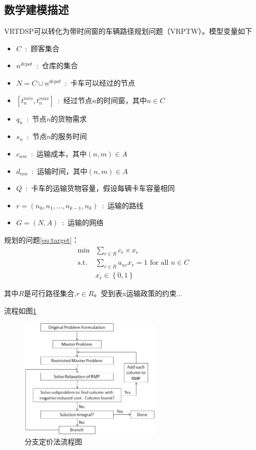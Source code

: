 \documentclass[11pt,a4paper,UTF8]{ctexart}
\numberwithin{equation}{section}
\begin{document}
\subsection{数学建模描述}
\label{sec:math_model}
VRTDSP可以转化为带时间窗的车辆路径规划问题（VRPTW）。模型变量如下
\begin{itemize}
	\item $C$~:~顾客集合
	\item $n^{depot}$~:~仓库的集合
	\item $N=C\cup n^{depot}$~:~卡车可以经过的节点
	\item $\left[t_{n}^{min}, t_{n}^{max}\right]$~:~经过节点$n$的时间窗，其中$n\in C$
	\item $q_n$~:~节点$n$的货物需求
	\item $s_n$~:~节点$n$的服务时间
	\item $c_{nm}$~:~运输成本，其中$\left(n,m\right) \in A $
	\item $d_{nm}$~:~运输时间，其中$\left(n,m\right) \in A $
	\item $Q$~:~卡车的运输货物容量，假设每辆卡车容量相同
	\item $r=\left(n_0,n_1,\ldots,n_{k-1},n_k\right)$~:~运输的路线
	\item $G=\left(N,A\right)$~:~运输的网络
\end{itemize}

规划的问题\ref{eq:target}：
\begin{subequations}
\begin{align}
	\min &\sum_{r\in R}{c_r \times x_r} \\
	\text{s.t.} &\sum_{r\in R}{a_{nr}x_r}=1 \text{ for all }n \in C \\
	& x_r \in \left\{ 0, 1\right\}
\end{align}
\label{eq:target}
\end{subequations}

其中$R$是可行路径集合,$r\in R$。受到表x运输政策的约束...


流程如图\ref{fig:Branch_and_price_diagram}

\begin{figure}[hbt]
	\centering
	\includegraphics[width=0.6\textwidth]{branch_and_price_diagram}
	\caption{分支定价法流程图}
	\label{fig:Branch_and_price_diagram}
\end{figure}


\clearpage



\clearpage
\end{document}

